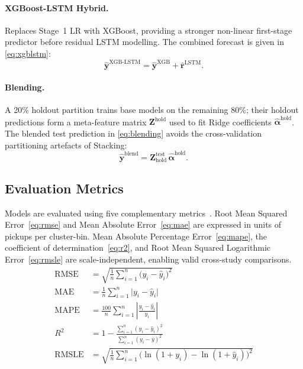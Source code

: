 \documentclass[a4paper,fleqn]{cas-dc}
\begin{document}
\paragraph{XGBoost-LSTM Hybrid.}  Replaces Stage~1 LR with XGBoost, providing a stronger non-linear first-stage predictor before residual LSTM modelling.  The combined forecast is given in \eqref{eq:xgblstm}:
\begin{equation}
  \hat{\mathbf{y}}^{\text{XGB-LSTM}} = \hat{\mathbf{y}}^{\text{XGB}} + \hat{\mathbf{r}}^{\text{LSTM}}.
  \label{eq:xgblstm}
\end{equation}

\paragraph{Blending.}  A 20\% holdout partition trains base models on the remaining 80\%; their holdout predictions form a meta-feature matrix $\mathbf{Z}^{\text{hold}}$ used to fit Ridge coefficients $\boldsymbol{\hat{\alpha}}^{\text{hold}}$.  The blended test prediction in \eqref{eq:blending} avoids the cross-validation partitioning artefacts of Stacking:
\begin{equation}
  \hat{\mathbf{y}}^{\text{blend}} = \mathbf{Z}^{\text{test}}_{\text{hold}}\,\boldsymbol{\hat{\alpha}}^{\text{hold}}.
  \label{eq:blending}
\end{equation}

\subsection{Evaluation Metrics}
\label{sec:metrics}

Models are evaluated using five complementary metrics~\cite{scikit-learn}.  Root Mean Squared Error~\eqref{eq:rmse} and Mean Absolute Error~\eqref{eq:mae} are expressed in units of pickups per cluster-bin.  Mean Absolute Percentage Error~\eqref{eq:mape}, the coefficient of determination~\eqref{eq:r2}, and Root Mean Squared Logarithmic Error~\eqref{eq:rmsle} are scale-independent, enabling valid cross-study comparisons.
\begin{align}
  \text{RMSE} &= \sqrt{\frac{1}{n}\sum_{i=1}^n \bigl(y_i - \hat{y}_i\bigr)^2} \label{eq:rmse} \\
  \text{MAE}  &= \frac{1}{n}\sum_{i=1}^n \bigl|y_i - \hat{y}_i\bigr| \label{eq:mae} \\
  \text{MAPE} &= \frac{100}{n}\sum_{i=1}^n \left|\frac{y_i - \hat{y}_i}{y_i}\right| \label{eq:mape} \\
  R^2         &= 1 - \frac{\displaystyle\sum_{i=1}^n(y_i-\hat{y}_i)^2}{\displaystyle\sum_{i=1}^n(y_i - \bar{y})^2} \label{eq:r2} \\
  \text{RMSLE}&= \sqrt{\frac{1}{n}\sum_{i=1}^n \bigl(\ln(1+y_i)-\ln(1+\hat{y}_i)\bigr)^2} \label{eq:rmsle}
\end{align}
\end{document}

